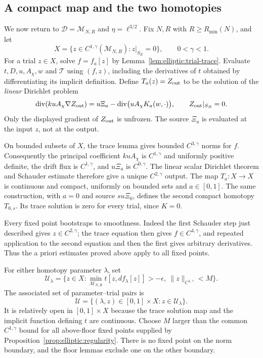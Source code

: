 \subsection{A compact map and the two homotopies}

We now return to $\mathcal D=\mathcal M_{N,R}$ and
$\eta=\ell^{3/2}$.  Fix $N,R$ with $R\ge R_{\min}(N)$, and let
\[
 X=\{z\in C^{1,\gamma}(\mathcal M_{N,R}):z|_{S_R}=0\},
 \qquad 0<\gamma<1.
\]
For a trial $z\in X$, solve $f=f_a[z]$ by
Lemma~\ref{lem:elliptic:trial-trace}.  Evaluate $t,D,u,A_\chi,w$ and
$\mathcal T$ using $(f,z)$, including the derivatives of $t$ obtained
by differentiating its implicit definition.  Define $T_a(z)=Z_{\rm out}$
to be the solution of the \emph{linear} Dirichlet problem
\begin{equation}\label{eq:elliptic:compact-map}
 \operatorname{div}(ku A_\chi\nabla Z_{\rm out})
   =u\Xi_a-\operatorname{div}\bigl(uA_\chi K_a(w,\cdot)\bigr),
 \qquad Z_{\rm out}|_{S_R}=0.
\end{equation}
Only the displayed gradient of $Z_{\rm out}$ is unfrozen.
The source $\Xi_a$ is evaluated at the input $z$, not at the output.

On bounded subsets of $X$, the trace lemma gives bounded
$C^{3,\gamma}$ norms for $f$.  Consequently the principal coefficient
$kuA_\chi$ is $C^{1,\gamma}$ and uniformly positive definite, the
drift flux is $C^{1,\gamma}$, and $u\Xi_a$ is $C^{0,\gamma}$.
The linear scalar Dirichlet theorem and Schauder estimate therefore
give a unique $C^{2,\gamma}$ output.  The map $T_a:X\to X$ is continuous
and compact, uniformly on bounded sets and $a\in[0,1]$.
The same construction, with $a=0$ and source $s u\Xi_0$, defines
the second compact homotopy $T_{0,s}$.  Its trace solution is zero for
every trial, since $K=0$.

Every fixed point bootstraps to smoothness.  Indeed the first
Schauder step just described gives $z\in C^{2,\gamma}$; the trace
equation then gives $f\in C^{4,\gamma}$, and repeated application to
the second equation and then the first gives arbitrary derivatives.
Thus the a priori estimates proved above apply to all fixed points.

For either homotopy parameter $\lambda$, set
\begin{equation}\label{eq:elliptic:degree-domain}
 \mathcal U_\lambda
 =\{z\in X:\min_{\mathcal M_{N,R}}t[z,df_\lambda[z]]>-\epsilon,
                         \ \|z\|_{C^{1,\gamma}}<M\}.
\end{equation}
The associated set of parameter--trial pairs is
\[
 \mathcal U=\{(\lambda,z)\in[0,1]\times X:z\in\mathcal U_\lambda\}.
\]
It is relatively open in $[0,1]\times X$ because the trace solution
map and the implicit function defining $t$ are continuous.  Choose $M$ larger than the common $C^{1,\gamma}$ bound
for all above-floor fixed points supplied by
Proposition~\ref{prop:elliptic:regularity}.  There is no fixed point
on the norm boundary, and the floor lemmas exclude one on the other
boundary.

